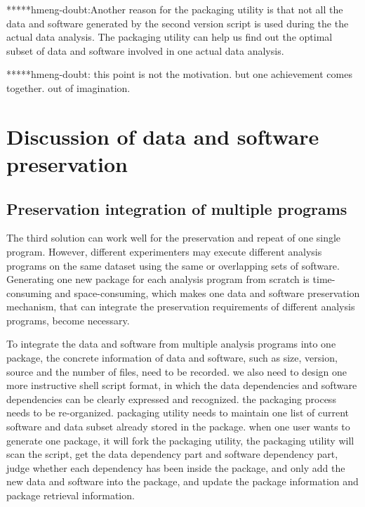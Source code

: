 \documentclass{acm_proc_article-sp}
\begin{document}
*****hmeng-doubt:Another reason for the packaging utility is that not all the data and software generated by the second version script is used during the the actual data analysis. The packaging utility can help us find out the optimal subset of data and software involved in one actual data analysis. 

*****hmeng-doubt: this point is not the motivation. but one achievement comes together. out of imagination.

\section{Discussion of data and software preservation}
\subsection{Preservation integration of multiple programs}
The third solution can work well for the preservation and repeat of one single program. However, different experimenters may execute different analysis programs on the same dataset using the same or overlapping sets of software. Generating one new package for each analysis program from scratch is time-consuming and space-consuming, which makes one data and software preservation mechanism, that can integrate the preservation requirements of different analysis programs, become necessary. 

To integrate the data and software from multiple analysis programs into one package, the concrete information of data and software, such as size, version, source and the number of files, need to be recorded. we also need to design one more instructive shell script format, in which the data dependencies and software dependencies can be clearly expressed and recognized. the packaging process needs to be re-organized. packaging utility needs to maintain one list of current software and data subset already stored in the package. when one user wants to generate one package, it will fork the packaging utility, the packaging utility will scan the script, get the data dependency part and software dependency part, judge whether each dependency has been inside the package, and only add the new data and software into the package, and update the package information and package retrieval information.
\end{document}
